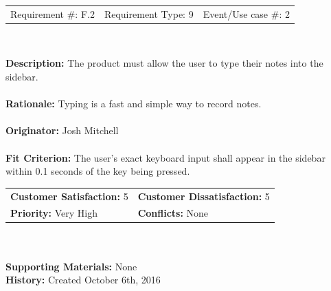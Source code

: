 \documentclass[12pt, titlepage]{article}
\begin{document}
\begin{framed}
	
	\begin{center}
		
		\begin{tabular}{ l c r }
			Requirement \#: F.2 & Requirement Type: 9 & Event/Use case \#: 2\\
		\end{tabular} \\
	\end{center}
	\textbf{Description:} The product must allow the user to type their notes 
	into the sidebar.\\
	\\
	\textbf{Rationale:} Typing is a fast and simple way to record notes. \\
	\\
	\textbf{Originator:} Josh Mitchell \\
	\\
	\textbf{Fit Criterion:} The user's exact keyboard input shall appear in the 
	sidebar within 0.1 seconds of the key being pressed. \\
	
	\begin{tabular}{ll}
		\textbf{Customer Satisfaction:} 5 & \textbf{Customer Dissatisfaction:} 
		5 \\
		\textbf{Priority:} Very High & \textbf{Conflicts:} None\\
	\end{tabular} \\
	\\
	\textbf{Supporting Materials:} None \\
	\textbf{History:} Created October 6th, 2016
	
\end{framed}
\end{document}
